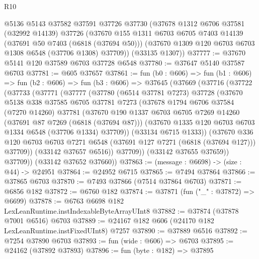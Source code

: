 \begin{lexlean}{R10}
\begin{coremodule}
    @5136
    @5143
    @37582
    @37591
    @37726
    @37730
    (@37678
      @1312
      @6706
      @37581
      (@32992 @14139)
      @37726
      (@37670
        @155
        @1311
        @6703
        @6705
        @7403
        @14139
        (@37691 @50 @7403 (@6818 (@37694 @50)))
        (@37670 @1309 @120 @6703 @6703 @1308 @6548 (@37706 @1308) @37709))
      (@33135 @1307))
@37777 := @37670 @5141 @120 @37589 @6703 @37728 @6548
@37780 := @37647 @5140 @37587 @6703
@37781 := @605 @37657
@37861 := fun (b0 : @606) =>
  fun (b1 : @606) =>
  fun (b2 : @606) =>
  fun (b3 : @606) =>
  @37645
    (@37669
      (@37716
        (@37722
          (@37733
            (@37771
              (@37777
                (@37780
                  (@6514 @37781 @7273)
                  @37728
                  (@37670
                    @5138
                    @338
                    @37585
                    @6705
                    @37781
                    @7273
                    (@37678
                      @1794
                      @6706
                      @37584
                      (@7270 @14260)
                      @37781
                      (@37670
                        @190
                        @1337
                        @6703
                        @6705
                        @7269
                        @14260
                        (@37691 @87 @7269 (@6818 (@37694 @87)))
                        (@37670 @1335 @120 @6703 @6703 @1334 @6548 (@37706 @1334) @37709))
                      (@33134 @6715 @1333))
                    (@37670
                      @336
                      @120
                      @6703
                      @6703
                      @7271
                      @6548
                      (@37691 @127 @7271 (@6818 (@37694 @127)))
                      @37709))
                  (@33142 @37657 @6516))
                @37709))
            (@33142 @37655 @37659))
          @37709))
      (@33142 @37652 @37660))
@37863 := (message : @6698) -> (size : @44) -> @24951
@37864 := @24952 @6715
@37865 := @7494 @37864
@37866 := @37865 @6703
@37870 := @7493 @37866 (@7514 @37864 @6703)
@37871 := @6856 @182
@37872 := @6760 @182
@37874 := @37871 (fun ("_" : @37872) => @6699)
@37878 := @6763 @6698 @182 LexLeanRuntime.instIndexableByteArrayUInt8
@37882 := @37874 (@37878 @7001 @6516) @6703
@37889 := @24167 @182 @606 (@24170 @182 LexLeanRuntime.instFixedUInt8) @7257
@37890 := @37889 @6516
@37892 := @7254 @37890 @6703
@37893 := fun (wide : @606) => @6703
@37895 := @24162 (@37892 @37893)
@37896 := fun (byte : @182) => @37895

\end{coremodule}
\end{lexlean}
